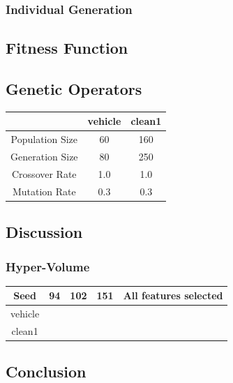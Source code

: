 \documentclass{article}
\begin{document}
\subsubsection*{Individual Generation}
\subsection*{Fitness Function}
\subsection*{Genetic Operators}
\begin{center}
\begin{tabular}{|c|c|c|}
\hline
& vehicle & clean1 \\
\hline
Population Size & 60 & 160 \\
\hline
Generation Size & 80 & 250 \\
\hline
Crossover Rate & 1.0 & 1.0 \\
\hline
Mutation Rate & 0.3 & 0.3 \\
\hline
\end{tabular}
\end{center}
\subsection*{Discussion}
\subsubsection*{Hyper-Volume}
\begin{center}
\begin{tabular}{|c|c|c|c|c|}
\hline
Seed & 94 & 102 & 151 & All features selected\\
\hline
vehicle & & & & \\
\hline
clean1 & & & & \\
\hline
\end{tabular}
\end{center}
\subsection*{Conclusion}
\end{document}
